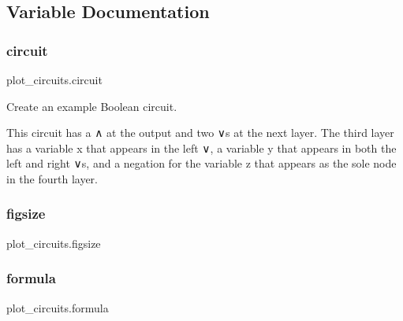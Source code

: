 \subsection{Variable Documentation}
\mbox{\label{namespaceplot__circuits_a9bd6403c4050c6fd929cfb75695b5b53}} 
\subsubsection{\texorpdfstring{circuit}{circuit}}
{\footnotesize\ttfamily plot\+\_\+circuits.\+circuit}



Create an example Boolean circuit. 





This circuit has a ∧ at the output and two ∨s at the next layer. The third layer has a variable x that appears in the left ∨, a variable y that appears in both the left and right ∨s, and a negation for the variable z that appears as the sole node in the fourth layer. \mbox{\label{namespaceplot__circuits_ab4f85a0d59ba6f09a08894be18b8c088}} 
\subsubsection{\texorpdfstring{figsize}{figsize}}
{\footnotesize\ttfamily plot\+\_\+circuits.\+figsize}

\mbox{\label{namespaceplot__circuits_ad769edfa526e13970779974be2996d26}} 
\subsubsection{\texorpdfstring{formula}{formula}}
{\footnotesize\ttfamily plot\+\_\+circuits.\+formula}

\mbox{\label{namespaceplot__circuits_a810a118dd2957d285f2700ec674e4312}} 
